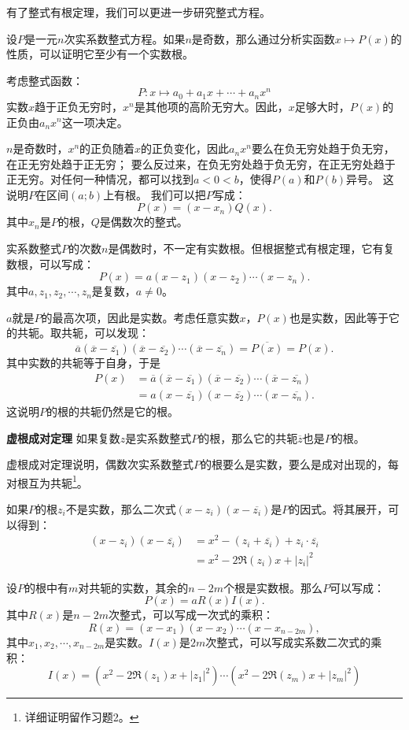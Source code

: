 \documentclass[12pt,UTF8]{ctexbook}
\begin{document}
\begin{appendix}
有了整式有根定理，我们可以更进一步研究整式方程。

设$P$是一元$n$次实系数整式方程。如果$n$是奇数，那么通过分析实函数$x\mapsto P(x)$的性质，可以证明它至少有一个实数根。

考虑整式函数：
$$P: x\mapsto a_0 + a_1 x + \cdots + a_n x^n$$
实数$x$趋于正负无穷时，$x^n$是其他项的高阶无穷大。因此，$x$足够大时，$P(x)$的正负由$a_nx^n$这一项决定。

$n$是奇数时，$x^n$的正负随着$x$的正负变化，因此$a_nx^n$要么在负无穷处趋于负无穷，在正无穷处趋于正无穷；
要么反过来，在负无穷处趋于负无穷，在正无穷处趋于正无穷。对任何一种情况，都可以找到$a<0<b$，使得$P(a)$和$P(b)$异号。
这说明$P$在区间$(a;b)$上有根。
我们可以把$P$写成：
$$ P(x) = (x - x_n)Q(x).$$
其中$x_n$是$P$的根，$Q$是偶数次的整式。

实系数整式$P$的次数$n$是偶数时，不一定有实数根。但根据整式有根定理，它有复数根，可以写成：
$$ P(x) = a(x - z_1)(x - z_2)\cdots(x - z_n).$$
其中$a, z_1, z_2,\cdots, z_n$是复数，$a\neq 0$。

$a$就是$P$的最高次项，因此是实数。考虑任意实数$x$，$P(x)$也是实数，因此等于它的共轭。取共轭，可以发现：
$$ \overline{a}(\overline{x} - \overline{z_1})(\overline{x} - \overline{z_2})\cdots(\overline{x} - \overline{z_n}) = \overline{P(x)} = P(x).$$
其中实数的共轭等于自身，于是
\begin{align*}
    P(x) &= \overline{a}(\overline{x} - \overline{z_1})(\overline{x} - \overline{z_2})\cdots(\overline{x} - \overline{z_n}) \\
    &= a(x - \overline{z_1})(x - \overline{z_2})\cdots(x - \overline{z_n}). 
\end{align*}
这说明$P$的根的共轭仍然是它的根。
\begin{tm}{\textbf{虚根成对定理}}
    如果复数$z$是实系数整式$P$的根，那么它的共轭$\overline{z}$也是$P$的根。
\end{tm}
虚根成对定理说明，偶数次实系数整式$P$的根要么是实数，要么是成对出现的，每对根互为共轭\footnote{详细证明留作习题2。}。
  
如果$P$的根$z_i$不是实数，那么二次式$(x - z_i)(x - \overline{z_i})$是$P$的因式。将其展开，可以得到：
\begin{align*}
    (x - z_i)(x - \overline{z_i}) &= x^2 - (z_i + \overline{z_i}) + z_i\cdot\overline{z_i} \\
    &= x^2 - 2\Re(z_i)x + |z_i|^2
\end{align*}

设$P$的根中有$m$对共轭的实数，其余的$n-2m$个根是实数根。那么$P$可以写成：
$$ P(x) = aR(x)I(x).$$
其中$R(x)$是$n-2m$次整式，可以写成一次式的乘积：
$$ R(x) = (x - x_1)(x - x_2)\cdots(x - x_{n-2m}), $$
其中$x_1, x_2, \cdots, x_{n-2m}$是实数。$I(x)$是$2m$次整式，可以写成实系数二次式的乘积：
$$ I(x) = (x^2 - 2\Re(z_1)x + |z_1|^2) \cdots (x^2 - 2\Re(z_m)x + |z_m|^2)$$


\end{appendix}
\end{document}
